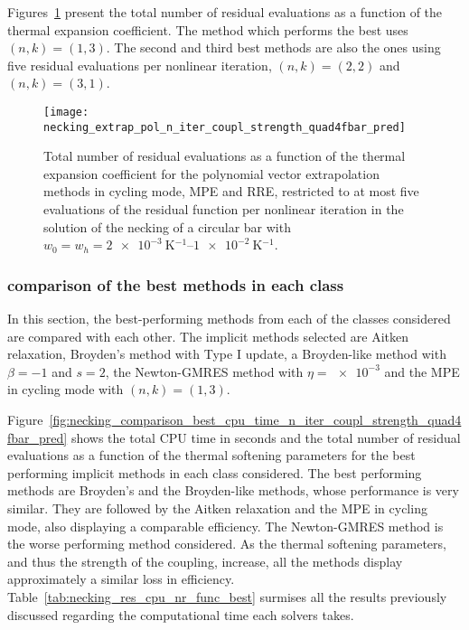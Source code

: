 Figures~\ref{fig:necking_extrap_pol_n_iter_coupl_strength_quad4fbar_pred} present the total number of residual evaluations as a function of the thermal expansion coefficient.
The method which performs the best uses \((n,k)=(1,3)\).
The second and third best methods are also the ones using five residual evaluations per nonlinear iteration, \((n,k)=(2,2)\) and \((n,k)=(3,1)\).

\begin{figure}[htbp]
 \centering
 \texttt{[image: necking\_extrap\_pol\_n\_iter\_coupl\_strength\_quad4fbar\_pred]}
 \caption{Total number of residual evaluations as a function of the thermal expansion coefficient for the polynomial vector extrapolation methods in cycling mode, MPE and RRE, restricted to at most five evaluations of the residual function per nonlinear iteration in the solution of the necking of a circular bar with \(w_0=w_h=\SIrange{2e-3}{1e-2}{\kelvin^{-1}}\).}
\label{fig:necking_extrap_pol_n_iter_coupl_strength_quad4fbar_pred}
\end{figure}

\FloatBarrier

\subsubsection{comparison of the best methods in each class}

In this section, the best-performing methods from each of the classes considered are compared with each other.
The implicit methods selected are Aitken relaxation, Broyden's method with Type I update, a Broyden-like method with \(\beta=-1\) and \(s=2\), the Newton-GMRES method with \(\eta=\num{e-3}\) and the MPE in cycling mode with \((n,k)=(1,3)\).

Figure~\ref{fig:necking_comparison_best_cpu_time_n_iter_coupl_strength_quad4fbar_pred} shows the total CPU time in seconds and the total number of residual evaluations as a function of the thermal softening parameters for the best performing implicit methods in each class considered.
The best performing methods are Broyden's and the Broyden-like methods, whose performance is very similar.
They are followed by the Aitken relaxation and the MPE in cycling mode, also displaying a comparable efficiency.
The Newton-GMRES method is the worse performing method considered.
As the thermal softening parameters, and thus the strength of the coupling, increase, all the methods display approximately a similar loss in efficiency.
Table~\ref{tab:necking_res_cpu_nr_func_best} surmises all the results previously discussed regarding the computational time each solvers takes.


